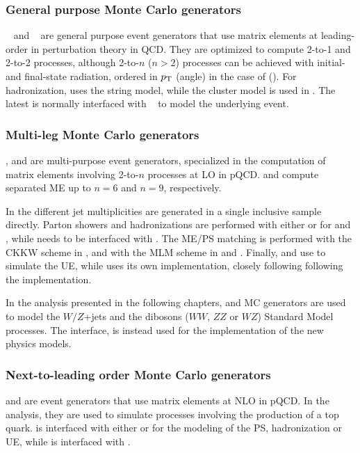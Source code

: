 \subsubsection{General purpose Monte Carlo generators}

\pythia{}~\cite{Sjostrand:2006za} and \herwig{}~\cite{Corcella:2000bw,Bahr:2008dy} are general purpose event generators that use matrix elements at leading-order in perturbation theory in QCD.
They are optimized to compute 2-to-1 and 2-to-2 processes, although 2-to-$n$ ($n>2$) processes can be achieved with initial- and final-state radiation, ordered in $p_{\mathrm{T}}$ (angle) in the case of \pythia{} (\herwig{}).
For hadronization, \pythia{} uses the string model, while the cluster model is used in \herwig{}.
The latest is normally interfaced with \jimmy{}~\cite{Butterworth:1996zw} to model the underlying event. 


\subsubsection{Multi-leg Monte Carlo generators}

\sherpa{} \cite{Gleisberg:2008ta}, \alpgen{} \cite{Mangano:2002ea} and \madgraph{} \cite{Alwall:2011uj} are multi-purpose event generators, specialized in the computation of matrix elements involving 2-to-$n$ processes at LO in pQCD.
\madgraph{} and \alpgen{} compute separated ME up to $n=6$ and $n=9$, respectively.

In \sherpa{} the different jet multiplicities are generated in a single inclusive sample directly.
Parton showers and hadronizations are performed with either \pythia{} or \herwig{} for \alpgen{} and \sherpa{}, while \madgraph{} needs to be interfaced with \pythia{}.
The ME/PS matching is performed with the CKKW scheme in \sherpa{}, and with the MLM scheme in \alpgen{} and \madgraph{}.
Finally, \alpgen{} and \madgraph{} use \pythia{} to simulate the UE, while \sherpa{} uses its own implementation, closely following following the \pythia{} implementation.

In the analysis presented in the following chapters, \sherpa{} and \alpgen{} MC generators are used to model the $W/Z$+jets and the dibosons ($WW$, $ZZ$ or $WZ$) Standard Model processes.
The \madgraph{} interface, is instead used for the implementation of the new physics models.


\subsubsection{Next-to-leading order Monte Carlo generators}

\mcnlo{} \cite{Frixione:2008ym} and \powheg{} \cite{Frixione:2007vw} are event generators that use matrix elements at NLO in pQCD.
In the analysis, they are used to simulate processes involving the production of a top quark. 
\powheg{} is interfaced with either \pythia{} or \herwig{} for the modeling of the PS, hadronization or UE, while \mcnlo{} is interfaced with \herwig{}.
